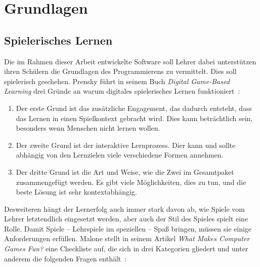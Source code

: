 \chapter{Grundlagen}
\label{sec:basics}

\section{Spielerisches Lernen}
\label{sec:basics:playful-learning}

Die im Rahmen dieser Arbeit entwickelte Software soll Lehrer dabei unterstützen ihren Schülern die Grundlagen des Programmierens zu vermittelt. Dies soll spielerisch geschehen. Prensky führt in seinem Buch \textit{Digital Game-Based Learning} drei Gründe an warum digitales spielerisches Lernen funktioniert~\cite[147]{prensky2007}:

\begin{enumerate}
    \item Der erste Grund ist das zusätzliche Engagement, das dadurch entsteht, dass das Lernen in einen Spielkontext gebracht wird. Dies kann beträchtlich sein, besonders wenn Menschen nicht lernen wollen.
    \item Der zweite Grund ist der interaktive Lernprozess. Dier kann und sollte abhängig von den Lernzielen viele verschiedene Formen annehmen.
    \item Der dritte Grund ist die Art und Weise, wie die Zwei im Gesamtpaket zusammengefügt werden. Es gibt viele Möglichkeiten, dies zu tun, und die beste Lösung ist sehr kontextabhängig.
\end{enumerate}

Desweiteren hängt der Lernerfolg auch immer stark davon ab, wie Spiele vom Lehrer letztendlich eingesetzt werden, aber auch der Stil des Spieles spielt eine Rolle. Damit Spiele -- Lehrspiele im speziellen -- Spaß bringen, müssen sie einige Anforderungen erfüllen. Malone stellt in seinem Artikel \textit{What Makes Computer Games Fun?} eine Checkliste auf, die sich in drei Kategorien gliedert und unter anderem die folgenden Fragen enthält~\cite[49]{malone1981}:


